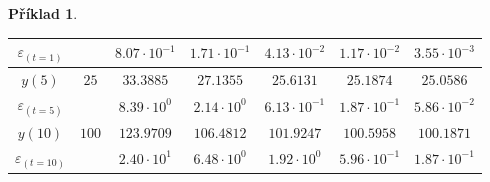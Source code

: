 \documentclass[a4paper,12pt,twoside]{article}
\theoremstyle{definition}
\newtheorem{prikl}[veta]{Příklad}
\theoremstyle{remark}
\numberwithin{equation}{section}
\numberwithin{table}{section}
\numberwithin{figure}{section}
\begin{document}
\begin{prikl}
\begin{table}[h!]
\begin{tabular}{|c||c|c|c|c|c|c|}
		$\varepsilon_{\left(t=1\right)}$ &  & $8.07 \cdot 10^{-1}$ & $1.71 \cdot 10^{-1}$ & $4.13 \cdot 10^{-2}$ & $1.17\cdot 10^{-2}$ & $3.55\cdot 10^{-3}$ \\
		\hline
		$y\left(5\right)$ & $25$ & $33.3885$ & $27.1355$ & $25.6131$ & $25.1874$ & $25.0586$  \\
		\hline
		$\varepsilon_{\left(t=5\right)}$ & & $ 8.39 \cdot 10^{0}$ & $2.14 \cdot 10^{0}$ & $6.13 \cdot 10^{-1}$ & $1.87\cdot 10^{-1}$ & $5.86 \cdot 10^{-2}$ \\
		\hline
		$y\left(10\right)$ & $100$ & $123.9709$ & $106.4812$ & $101.9247$ & $100.5958$ & $100.1871$  \\
		\hline
		$\varepsilon_{\left(t=10\right)}$ & & $ 2.40 \cdot 10^{1}$ & $6.48 \cdot 10^{0}$ & $1.92 \cdot 10^{0}$ & $5.96\cdot 10^{-1}$ & $1.87 \cdot 10^{-1}$ \\
		\hline
	\end{tabular}
\end{table}
\end{prikl}
\end{document}
